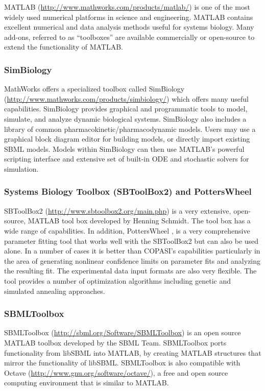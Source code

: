 MATLAB (\url{http://www.mathworks.com/products/matlab/}) is one of the
most widely used numerical platforms in science and engineering. MATLAB
contains excellent numerical and data analysis methods useful for
systems biology. Many add-ons, referred to as ``toolboxes'' are
available commercially or open-source to extend the functionality of
MATLAB.

\subsubsection{SimBiology}

MathWorks offers a specialized toolbox called SimBiology
(\url{http://www.mathworks.com/products/simbiology/}) which offers many
useful capabilities. SimBiology provides graphical and programmatic
tools to model, simulate, and analyze dynamic biological systems.
SimBiology also includes a library of common
pharmacokinetic/pharmacodynamic models. Users may use a graphical block
diagram editor for building models, or directly import existing SBML
models. Models within SimBiology can then use MATLAB's powerful
scripting interface and extensive set of built-in ODE and stochastic
solvers for simulation.

\subsubsection{Systems Biology Toolbox (SBToolBox2) and PottersWheel}

SBToolBox2 (\url{http://www.sbtoolbox2.org/main.php})
\autocite{schmidt2006systems} is a very extensive, open- source, MATLAB
tool box developed by Henning Schmidt. The tool box has a wide range of
capabilities. In addition, PottersWheel \autocite{maiwald2008dynamical},
is a very comprehensive parameter fitting tool that works well with the
SBToolBox2 but can also be used alone. In a number of cases it is better
than COPASI's capabilities particularly in the area of generating
nonlinear confidence limits on parameter fits and analyzing the
resulting fit. The experimental data input formats are also very
flexible. The tool provides a number of optimization algorithms
including genetic and simulated annealing approaches.

\subsubsection{SBMLToolbox}

SBMLToolbox (\url{http://sbml.org/Software/SBMLToolbox})
\autocite{keating2006sbmltoolbox} is an open source MATLAB toolbox
developed by the SBML Team. SBMLToolbox ports functionality from libSBML
into MATLAB, by creating MATLAB structures that mirror the functionality
of libSBML. SBMLToolbox is also compatible with Octave
(\url{http://www.gnu.org/software/octave/}), a free and open source
computing environment that is similar to MATLAB.

